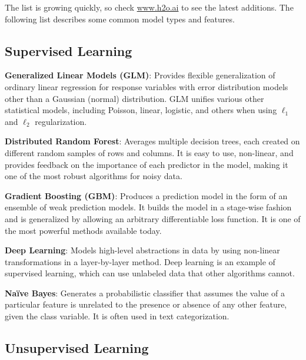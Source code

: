 {\begin{frame}
\begin{tabular}{p{5.5cm}p{5.5cm}}
\end{tabular}

\end{frame}

The list is growing quickly, so check \url{www.h2o.ai} to see the latest additions. The following list describes some common model types and features. 

\subsection{Supervised Learning}

{\textbf{Generalized Linear Models (GLM)}}: Provides flexible generalization of ordinary linear regression for response variables with error distribution models other than a Gaussian (normal) distribution. GLM unifies various other statistical models, including Poisson, linear, logistic, and others when using $\ell_1$ and $\ell_2$ regularization.

{\textbf{Distributed Random Forest}}: Averages multiple decision trees, each created on different random samples of rows and columns. It is easy to use, non-linear, and provides feedback on the importance of each predictor in the model, making it one of the most robust algorithms for noisy data.

{\textbf{Gradient Boosting (GBM)}}: Produces a prediction model in the form of an ensemble of weak prediction models. It builds the model in a stage-wise fashion and is generalized by allowing an arbitrary differentiable loss function. It is one of the most powerful methods available today.

{\textbf{Deep Learning}}: Models high-level abstractions in data by using non-linear transformations in a layer-by-layer method. Deep learning is an example of supervised learning, which can use unlabeled data that other algorithms cannot.

{\textbf{Na\"{i}ve Bayes}}: Generates a probabilistic classifier that assumes the value of a particular feature is unrelated to the presence or absence of any other feature, given the class variable. It is often used in text categorization.

\subsection{Unsupervised Learning}

}
